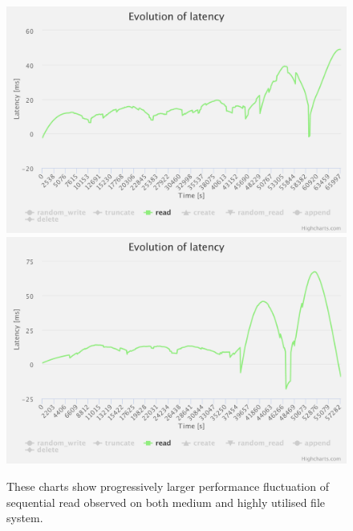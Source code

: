 \documentclass[
  color, %
  table, %
  lof,   %
  lot,   %
]{fithesis3}
\begin{document}
\begin{figure}[!htb]
    \centering
   \begin{minipage}{\textwidth}
        \centering
        \includegraphics[width=\textwidth]{../charts/HDD_xfs/read_high}
        \includegraphics[width=\textwidth]{../charts/HDD_xfs/read_low}
        \caption[Evolution of sequential read of XFS during testing of high and medium utilisation of HDD]{These charts show progressively larger performance fluctuation of sequential read observed on both medium and highly utilised file system.}
\label{fig:read_lh}
    \end{minipage}
\end{figure}

\clearpage
\end{document}
